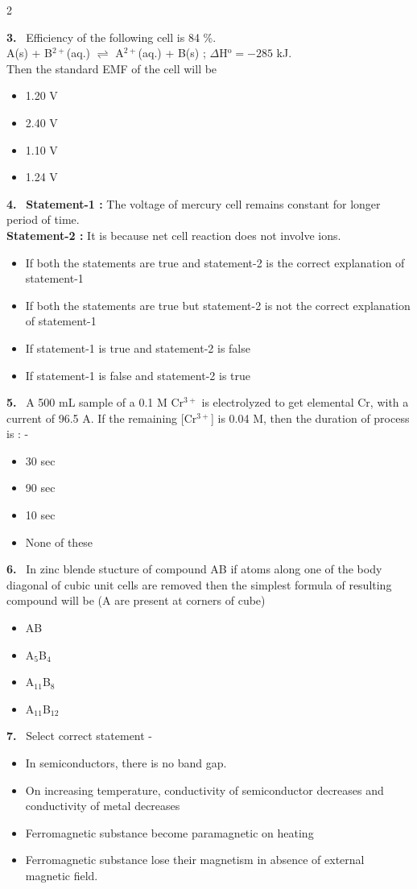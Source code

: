 \documentclass[10pt]{extarticle}
\newcommand{\qn}[1]{\par\smallskip\noindent\textbf{#1.}~}
\newenvironment{qoptions}{\begin{itemize}[leftmargin=1.8em,itemsep=1pt,topsep=2pt,label={}]}{\end{itemize}}
\newcommand{\opt}[2]{\item[(#1)] #2}
\begin{document}
\begin{multicols}{2}
\qn{3} Efficiency of the following cell is 84 \%.\\
A(s) + B$^{2+}$(aq.) $\rightleftharpoons$ A$^{2+}$(aq.) + B(s) ; $\Delta$H$^\mathrm{o}=-285$ kJ.\\
Then the standard EMF of the cell will be\\
\relax[Use 1F = 96500 C]
\begin{qoptions}
\opt{A}{1.20 V}
\opt{B}{2.40 V}
\opt{C}{1.10 V}
\opt{D}{1.24 V}
\end{qoptions}

\qn{4} \textbf{Statement-1 :} The voltage of mercury cell remains constant for longer period of time.\\
\textbf{Statement-2 :} It is because net cell reaction does not involve ions.
\begin{qoptions}
\opt{A}{If both the statements are true and statement-2 is the correct explanation of statement-1}
\opt{B}{If both the statements are true but statement-2 is not the correct explanation of statement-1}
\opt{C}{If statement-1 is true and statement-2 is false}
\opt{D}{If statement-1 is false and statement-2 is true}
\end{qoptions}

\qn{5} A 500 mL sample of a 0.1 M Cr$^{3+}$ is electrolyzed to get elemental Cr, with a current of 96.5 A. If the remaining [Cr$^{3+}$] is 0.04 M, then the duration of process is : -
\begin{qoptions}
\opt{A}{30 sec}
\opt{B}{90 sec}
\opt{C}{10 sec}
\opt{D}{None of these}
\end{qoptions}

\qn{6} In zinc blende stucture of compound AB if atoms along one of the body diagonal of cubic unit cells are removed then the simplest formula of resulting compound will be (A are present at corners of cube)
\begin{qoptions}
\opt{A}{AB}
\opt{B}{A$_5$B$_4$}
\opt{C}{A$_{11}$B$_8$}
\opt{D}{A$_{11}$B$_{12}$}
\end{qoptions}

\qn{7} Select correct statement -
\begin{qoptions}
\opt{A}{In semiconductors, there is no band gap.}
\opt{B}{On increasing temperature, conductivity of semiconductor decreases and conductivity of metal decreases}
\opt{C}{Ferromagnetic substance become paramagnetic on heating}
\opt{D}{Ferromagnetic substance lose their magnetism in absence of external magnetic field.}
\end{qoptions}


\end{multicols}
\end{document}
